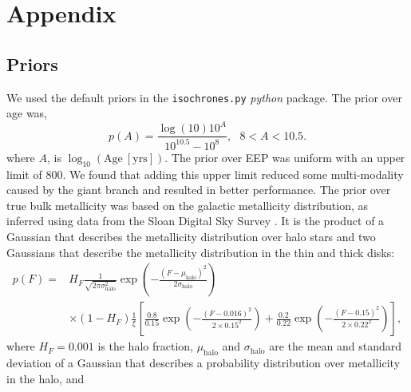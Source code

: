 \section{Appendix}
\label{section:appendix}

\subsection*{Priors}
\label{section:priors}

We used the default priors in the {\tt isochrones.py} {\it python} package.
The prior over age was,
\begin{equation}
p(A) = \frac{\log(10) 10^{A}}{10^{10.5} - 10^8}, ~~~ 8 < A < 10.5.
\end{equation}
where $A$, is $\log_{10}(\mathrm{Age~[yrs]})$.
The prior over EEP was uniform with an upper limit of 800.
We found that adding this upper limit reduced some multi-modality caused by
the giant branch and resulted in better performance.
The prior over true bulk metallicity was based on the galactic metallicity
distribution, as inferred using data from the Sloan Digital Sky Survey
.
It is the product of a Gaussian that describes the metallicity distribution
over halo stars and two Gaussians that describe the metallicity distribution
in the thin and thick disks:
\begin{eqnarray}
    p(F) =
    & H_F \frac{1}{\sqrt{2\pi\sigma_{\mathrm{halo}}^2}}
    \exp\left(-\frac{(F-\mu_{\mathrm{halo}})^2}{2\sigma_{\mathrm{halo}}}\right)
    \\ \nonumber
    & \times (1-H_F)
    \frac{1}{\xi}
    \left[\frac{0.8}{0.15}\exp\left(-\frac{(F-0.016)^2}{2\times 0.15^2}\right)
    + \frac{0.2}{0.22}\exp\left(-\frac{(F-0.15)^2}{2\times
    0.22^2}\right)\right],
\end{eqnarray}
where $H_F = 0.001$ is the halo fraction, $\mu_\mathrm{halo}$ and
$\sigma_{\mathrm{halo}}$ are the mean and standard deviation of a Gaussian
that describes a probability distribution over metallicity in the halo, and
